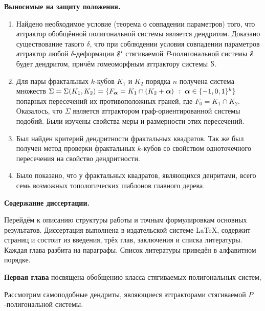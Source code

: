 \begin{center}
\textbf{Выносимые на защиту положения.}
\end{center}

\begin{enumerate}
\item Найдено необходимое условие (теорема о совпадении параметров) того, что аттрактор обобщённой полигональной системы является дендритом.
Доказано существование такого $\delta$, что при соблюдении условия совпадении параметров аттрактор любой $\delta$-деформации ${\EuScript S}'$ стягиваемой $P$-полигональной системы ${\EuScript S}$ будет дендритом, причём гомеоморфным аттрактору системы ${\EuScript S}$.

\item Для пары фрактальных $k$-кубов $K_1$ и $K_2$ порядка $n$ получена система множеств $\Sigma=\Sigma(K_1,K_2)=\{F_\bma=K_1\cap(K_2+\bma)\ :\ \bma\in\{-1,0,1\}^k\}$ попарных пересечений их противоположных граней, где $F_0=K_1\cap K_2$. 
Оказалось, что $\Sigma$ является аттрактором граф-ориентированной системы подобий.
Были изучены свойства меры и размерности этих пересечений.

\item Был найден критерий дендритности фрактальных квадратов. Так же был получен метод проверки фрактальных $k$-кубов со свойством одноточечного пересечения на свойство дендритности.

\item Было показано, что у фрактальных квадратов, являющихся денритами, всего семь возможных топологических шаблонов главного дерева.
\end{enumerate}

\begin{center}
    \textbf{Содержание диссертации.}
\end{center}

Перейдём к описанию структуры работы и точным формулировкам основных результатов.
Диссертация выполнена в издательской системе \LaTeX, содержит  страниц и состоит из введения, трёх глав, заключения и списка литературы.
Каждая глава разбита на параграфы.
Список литературы приведён в алфавитном порядке.

\textbf{Первая глава} посвящена обобщению класса стягиваемых полигональных систем,

Рассмотрим самоподобные дендриты, являющиеся аттракторами стягиваемой $P$-полигональной системы.



